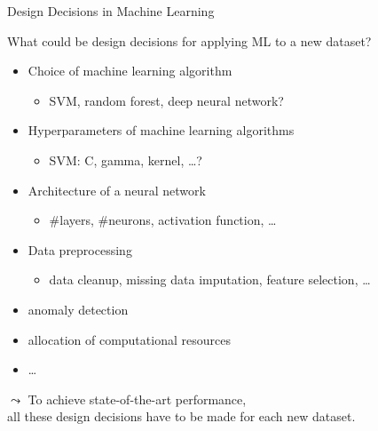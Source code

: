 \begin{frame}[c]{Design Decisions in Machine Learning}

What could be design decisions for applying ML to a new dataset?
\hands

\pause

\begin{itemize}
  \item Choice of machine learning algorithm
  \begin{itemize}
    \item SVM, random forest, deep neural network?
  \end{itemize}
  \pause
  \item Hyperparameters of machine learning algorithms
  \begin{itemize}
    \item SVM: C, gamma, kernel, \ldots?
  \end{itemize}
  \pause
  \item Architecture of a neural network
  \begin{itemize}
    \item $\#$layers, $\#$neurons, activation function, \ldots 
  \end{itemize}
  \pause
  \item Data preprocessing
  \begin{itemize}
  	\item data cleanup, missing data imputation, feature selection, \ldots  
  \end{itemize}
  \pause
  \item anomaly detection
  \item allocation of computational resources
  \item \ldots
\end{itemize}

\medskip
$\leadsto$ To achieve state-of-the-art performance,\\ all these design decisions have to be made for each new dataset.

\end{frame}
